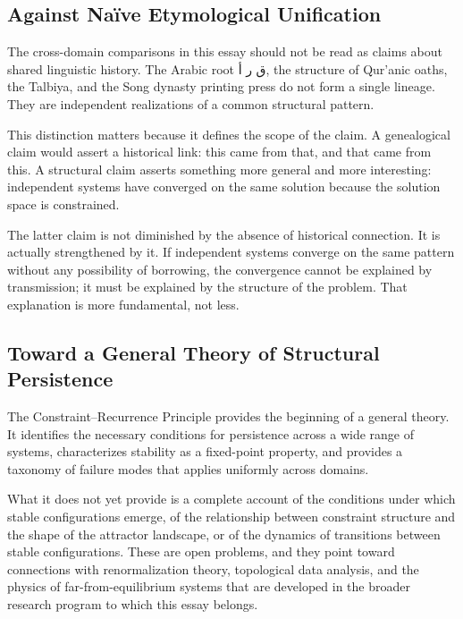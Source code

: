 \documentclass[12pt, oneside]{article}
\newcommand{\AR}[1]{\textarabic{#1}}
\theoremstyle{definition}
\theoremstyle{remark}
\begin{document}
\subsection{Against Na\"{i}ve Etymological Unification}

The cross-domain comparisons in this essay should not be read as claims about shared linguistic history.
The Arabic root \AR{ق ر أ}, the structure of Qur'anic oaths, the Talbiya, and the Song dynasty printing press do not form a single lineage.
They are independent realizations of a common structural pattern.

This distinction matters because it defines the scope of the claim.
A genealogical claim would assert a historical link: this came from that, and that came from this.
A structural claim asserts something more general and more interesting: independent systems have converged on the same solution because the solution space is constrained.

The latter claim is not diminished by the absence of historical connection.
It is actually strengthened by it.
If independent systems converge on the same pattern without any possibility of borrowing, the convergence cannot be explained by transmission; it must be explained by the structure of the problem.
That explanation is more fundamental, not less.

\subsection{Toward a General Theory of Structural Persistence}

The Constraint--Recurrence Principle provides the beginning of a general theory.
It identifies the necessary conditions for persistence across a wide range of systems, characterizes stability as a fixed-point property, and provides a taxonomy of failure modes that applies uniformly across domains.

What it does not yet provide is a complete account of the conditions under which stable configurations emerge, of the relationship between constraint structure and the shape of the attractor landscape, or of the dynamics of transitions between stable configurations.
These are open problems, and they point toward connections with renormalization theory, topological data analysis, and the physics of far-from-equilibrium systems that are developed in the broader research program to which this essay belongs.

\end{document}
